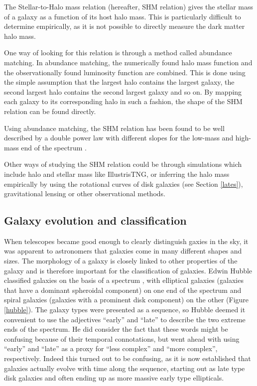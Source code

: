 The Stellar-to-Halo mass relation (hereafter, SHM relation) gives the stellar mass of a galaxy as a function of its host halo mass. This is particularly difficult to determine empirically, as it is not possible to directly measure the dark matter halo mass.

One way of looking for this relation is through a method called abundance matching. In abundance matching, the numerically found halo mass function and the observationally found luminosity function are combined. This is done using the simple assumption that the largest halo contains the largest galaxy, the second largest halo contains the second largest galaxy and so on. By mapping each galaxy to its corresponding halo in such a fashion, the shape of the SHM relation can be found directly.

Using abundance matching, the SHM relation has been found to be well described by a double power law with different slopes for the low-mass and high-mass end of the spectrum \parencite{Behroozi2013}. 

Other ways of studying the SHM relation could be through simulations which include halo and stellar mass like IllustrisTNG, or inferring the halo mass empirically by using the rotational curves of disk galaxies (see Section \ref{lates}), gravitational lensing or other observational methods.

\subsection{Galaxy evolution and classification}

When telescopes became good enough to clearly distinguish gaxies in the sky, it was apparent to astronomers that galaxies come in many different shapes and sizes. The morphology of a galaxy is closely linked to other properties of the galaxy and is therefore important for the classification of galaxies. Edwin Hubble classified galaxies on the basis of a spectrum \parencite{Hubble1926}, with elliptical galaxies (galaxies that have a dominant spheroidal component) on one end of the spectrum and spiral galaxies (galaxies with a prominent disk component) on the other (Figure \ref{hubble}). The galaxy types were presented as a sequence, so Hubble deemed it convenient to use the adjectives ``early'' and ``late'' to describe the two extreme ends of the spectrum. He did consider the fact that these words might be confusing because of their temporal connotations, but went ahead with using ``early'' and ``late'' as a proxy for ``less complex'' and ``more complex'', respectively. Indeed this turned out to be confusing, as it is now established that galaxies actually evolve with time along the sequence, starting out as late type disk galaxies and often ending up as more massive early type ellipticals.

